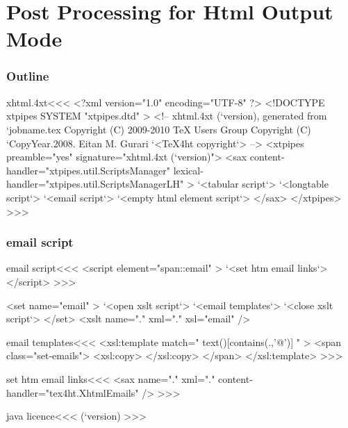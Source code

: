 \documentclass{article}
\begin{document}



\part{Post Processing for Html Output Mode}


\section{Outline}



\<xhtml.4xt\><<<
<?xml version="1.0" encoding="UTF-8" ?>
<!DOCTYPE xtpipes SYSTEM "xtpipes.dtd" >
<!-- xhtml.4xt (`version), generated from `jobname.tex
     Copyright (C) 2009-2010 TeX Users Group
     Copyright (C) `CopyYear.2008. Eitan M. Gurari
`<TeX4ht copyright`> -->
<xtpipes preamble="yes" signature="xhtml.4xt (`version)">
   <sax content-handler="xtpipes.util.ScriptsManager" 
        lexical-handler="xtpipes.util.ScriptsManagerLH" >
     `<tabular script`>
     `<longtable script`>
     `<email script`>
     `<empty html element script`>
   </sax>
</xtpipes>
>>>


\section{email script}

\<email script\><<<
<script element="span::email" >
   `<set htm email links`>
</script> 
>>>

   <set name="email" >
      `<open xslt script`>
      `<email templates`>
      `<close xslt script`>
   </set>
   <xslt name="." xml="." xsl="email" />


\<email templates\><<<
<xsl:template match=" text()[contains(.,'@')] " >
<span class="set-emails">
      <xsl:copy>
      </xsl:copy> 
</span>     
</xsl:template> 
>>>


\<set htm email links\><<<
<sax name="." xml="." content-handler="tex4ht.XhtmlEmails" />
>>>




\<java licence\><<<
(`version)
>>>


 
\end{document}
